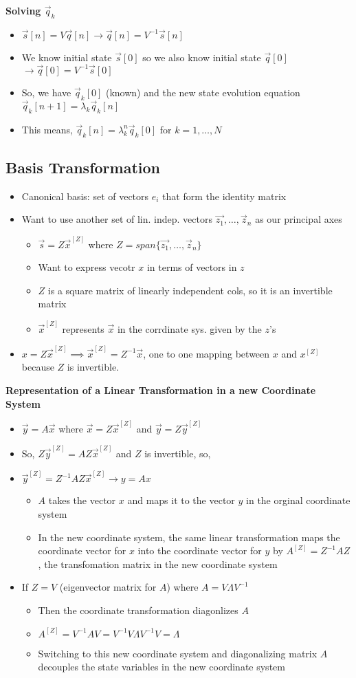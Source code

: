 \documentclass{article}\usepackage{amsmath,amssymb,amsthm,tikz,tkz-graph,color,chngpage,soul,hyperref,csquotes,graphicx,floatrow,framed,scrextend,mathtools,mathrsfs,setspace}\newcommand*{\QEDB}{\hfill\ensuremath{\square}}\newtheorem*{prop}{Proposition}\renewcommand{\theenumi}{\alph{enumi}}\usepackage[shortlabels]{enumitem}\usepackage[nobreak=true]{mdframed}\usetikzlibrary{matrix,calc}\MakeOuterQuote{"}\usepackage[margin=0.75in]{geometry} \newtheorem{theorem}{Theorem}\newcommand{\Z}{\mathbb Z}\newcommand{\R}{\mathbb R}\newcommand{\Q}{\mathbb Q}\newcommand{\N}{\mathbb N}\newcommand{\x}[1]{\textrm{#1}}\newcommand{\xs}[1]{\textrm{ #1 }}\newcommand{\pr}{\textrm{Pr}}
\newcommand{\set}[1]{\{#1\}}
\newcommand{\items}[1]{\begin{itemize}#1\end{itemize}}
\newcommand{\la}{\lambda}
\newcommand{\La}{\Lambda}
\begin{document}
\textbf{Solving $\vec{q}_k$}
\items{
    \item $\vec{s}[n]=V\vec{q}[n]\rightarrow\vec{q}[n]=V^{-1}\vec{s}[n]$
    \item We know initial state $\vec{s}[0]$ so we also know initial state $\vec{q}[0]$ $\rightarrow\vec{q}[0]=V^{-1}\vec{s}[0]$
    \item So, we have $\vec{q}_k[0]$ (known) and the new state evolution equation $\vec{q}_k[n+1]=\la_k\vec{q}_k[n]$
    \item This means, $\vec{q}_k[n]=\la_k^n\vec{q}_k[0]$ for $k=1,\ldots,N$
}
\subsection*{Basis Transformation}
\items{
    \item Canonical basis: set of vectors $e_i$ that form the identity matrix
    \item Want to use another set of lin. indep. vectors $\vec{z_1},\ldots, \vec{z}_n$ as our principal axes
    \items{
        \item $\vec{s}=Z\vec{x}^{[Z]}$ where $Z=span\set{\vec{z_1},\ldots, \vec{z}_n}$
        \item Want to express vecotr $x$ in terms of vectors in $z$
        \item $Z$ is a square matrix of linearly independent cols, so it is an invertible matrix
        \item $\vec{x}^{[Z]}$  represents $\vec{x}$ in the corrdinate sys. given by the $z$'s
    }
    \item $x=Z\vec{x}^{[Z]}\implies \vec{x}^{[Z]}=Z^{-1}\vec{x}$, one to one mapping between $x$ and $x^{[Z]}$ because $Z$ is invertible.
}
\textbf{Representation of a Linear Transformation in a new Coordinate System}
\items{
    \item $\vec{y}=A\vec{x}$ where $\vec{x}=Z\vec{x}^{[Z]}$ and $\vec{y}=Z\vec{y}^{[Z]}$
    \item So, $Z\vec{y}^{[Z]}=AZ\vec{x}^{[Z]}$ and $Z$ is invertible, so,
    \item $\vec{y}^{[Z]}=Z^{-1}AZ\vec{x}^{[Z]}\rightarrow y=Ax$
    \items{
        \item $A$ takes the vector $x$ and maps it to the vector $y$ in the orginal coordinate system
        \item In the new coordinate system, the same linear transformation maps the coordinate vector for $x$ into the coordinate vector for $y$ by $A^{[Z]}=Z^{-1}AZ$, the transfomation matrix in the new coordinate system
    }
    \item If $Z=V$ (eigenvector matrix for $A$) where $A=V\La V^{-1}$
    \items{
        \item Then the coordinate transformation diagonlizes $A$
        \item $A^{[Z]}=V^{-1}AV=V^{-1}V\La V^{-1}V=\La$
        \item Switching to this new coordinate system and diagonalizing matrix $A$ decouples the state variables in the new coordinate system
    }
}
\end{document}
